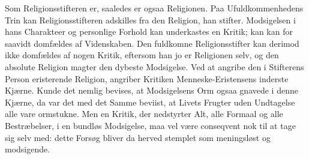\documentclass[12pt,a4paper]{book}
\begin{document}
Som Religionsstifteren er, saaledes er ogsaa Religionen. Paa Ufuldkommenhedens Trin kan
Religionsstifteren adskilles fra den Religion, han stifter. Modsigelsen i hans
Charakteer og personlige Forhold kan underkastes en Kritik; kan kan for\-%
saavidt domfældes af Videnskaben. Den fuldkomne Religionsstifter kan derimod ikke
domfældes af nogen Kritik, eftersom han jo er Religionen selv, og den absolute Religion
magter den dybeste Modsigelse. Ved at angribe den i Stifterens Person eristerende
Religion, angriber Kritiken Menneske-Eristensens inderste Kjærne. Kunde det nemlig
bevises, at Modsigelsens Orm ogsaa gnavede i denne Kjærne, da var det med det Samme
beviist, at Livets Frugter uden Undtagelse alle vare ormstukne. Men en Kritik, der
nedstyrter Alt, alle Formaal og alle Bestræbelser, i en bundløs Modsigelse, maa vel
være conseqvent nok til at tage sig selv med: dette Forsøg bliver da herved stemplet
som meningsløst og modsigende.
\end{document}
